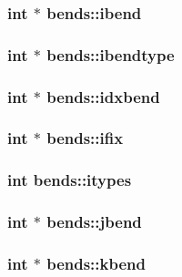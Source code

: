 \subsubsection{\setlength{\rightskip}{0pt plus 5cm}int $\ast$ {\bf bends::ibend}}\label{structbends_ce1aebfd6d650470686325447a4bb2d2}


\subsubsection{\setlength{\rightskip}{0pt plus 5cm}int $\ast$ {\bf bends::ibendtype}}\label{structbends_5040c00af36f7d409d798b83483c2793}


\subsubsection{\setlength{\rightskip}{0pt plus 5cm}int $\ast$ {\bf bends::idxbend}}\label{structbends_4ffd04c4a7d4b116c6a358a806347fb5}


\subsubsection{\setlength{\rightskip}{0pt plus 5cm}int $\ast$ {\bf bends::ifix}}\label{structbends_08d0e9681dbd8055da95b50e0d203690}


\subsubsection{\setlength{\rightskip}{0pt plus 5cm}int {\bf bends::itypes}}\label{structbends_7c9981cd67140c43ab742bd7b27b5148}


\subsubsection{\setlength{\rightskip}{0pt plus 5cm}int $\ast$ {\bf bends::jbend}}\label{structbends_2d59403249a733f9661822690deca7ca}


\subsubsection{\setlength{\rightskip}{0pt plus 5cm}int $\ast$ {\bf bends::kbend}}\label{structbends_9976f615479ebcaa99915dc72b3be44f}


